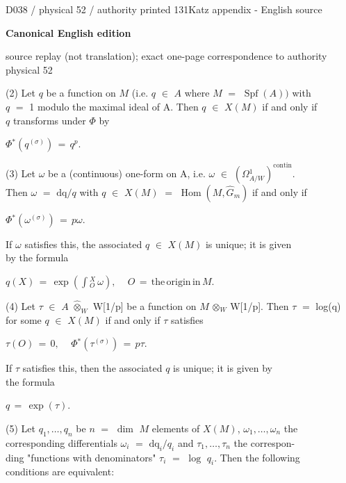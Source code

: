 \documentclass[9pt]{article}
\newcommand{\CanonText}[1]{\par{\fontsize{8.0}{9.35}\selectfont\RaggedRight #1\par}\vspace{2.2pt}}
\newcommand{\CanonDisplay}[1]{\par\vspace{1.2pt}\begin{center}{\fontsize{7.2}{8.4}\selectfont\(\displaystyle #1\)}\end{center}\vspace{1.2pt}}
\newcommand{\LayerTitle}{Canonical English edition}
\begin{document}
\noindent\begin{minipage}[t][\dimexpr\textheight-5pt\relax][t]{\textwidth}
{\sffamily\fontsize{7.3}{8.2}\selectfont\color{Quiet} D038 / physical 52 / authority printed 131\hfill Katz appendix - English source}
\par{}\vspace{4.5pt}
{\sffamily\fontsize{10.4}{11.6}\selectfont\bfseries\color{Accent} \LayerTitle}
\par{\sffamily\fontsize{6.7}{7.7}\selectfont\color{Quiet} source replay (not translation); exact one-page correspondence to authority physical 52}
\vspace{5pt}
\CanonText{(2) Let \(q\) be a function on \(M\) (i.e. \(q\) \(\in{}\) \(A\) where \(M\) \(=\) \(\operatorname{Spf}(A))\) with\\\(q\) \(=\) 1 modulo the maximal ideal of A. Then \(q\) \(\in{}\) \(X(M)\) if and only if\\\(q\) transforms under \(\Phi{}\) by}
\CanonDisplay{\Phi{}^{*}(q^{(\sigma{})})\,=\,q^{p}.}
\CanonText{(3) Let \(\omega{}\) be a (continuous) one-form on A, i.e. \(\omega{}\) \(\in{}\) \((\Omega{}^{1}_{A/W})^{\mathrm{contin}}\).\\Then \(\omega{}\) \(=\) \(\text{dq}/q\) with \(q\) \(\in{}\) \(X(M)\) \(=\) \(\operatorname{Hom}(M,\widehat{G}_{m})\) if and only if}
\CanonDisplay{\Phi{}^{*}(\omega{}^{(\sigma{})})\,=\,p\omega{}.}
\CanonText{If \(\omega{}\) satisfies this, the associated \(q\) \(\in{}\) \(X(M)\) is unique; it is given\\by the formula}
\CanonDisplay{q(X)\,=\,\operatorname{exp}(\int{}_{O}^{X}\,\omega{}),\quad\,O\,=\,\text{the}\,\text{origin}\,\text{in}\,M.}
\CanonText{(4) Let \(\tau{}\) \(\in{}\) \(A\) \(\widehat{\otimes}_{W}\) W[1/p] be a function on \(M\) \(\otimes{}_{W}\) W[1/p]. Then \(\tau{}\) \(=\) log(q)\\for some \(q\) \(\in{}\) \(X(M)\) if and only if \(\tau{}\) satisfies}
\CanonDisplay{\tau{}(O)\,=\,0,\quad\,\Phi{}^{*}(\tau{}^{(\sigma{})})\,=\,p\tau{}.}
\CanonText{If \(\tau{}\) satisfies this, then the associated \(q\) is unique; it is given by\\the formula}
\CanonDisplay{q\,=\,\operatorname{exp}(\tau{}).}
\CanonText{(5) Let \(q_{1},\ldots{},q_{n}\) be \(n\) \(=\) \(\operatorname{dim}\) \(M\) elements of \(X(M)\), \(\omega{}_{1},\ldots{},\omega{}_{n}\) the\\corresponding differentials \(\omega{}_{i}\) \(=\) \(\text{dq}_{i}/q_{i}\) and \(\tau{}_{1},\ldots{},\tau{}_{n}\) the correspon-\\ding "functions with denominators" \(\tau{}_{i}\) \(=\) \(\operatorname{log}\) \(q_{i}\). Then the following\\conditions are equivalent:}

\end{minipage}
\end{document}
